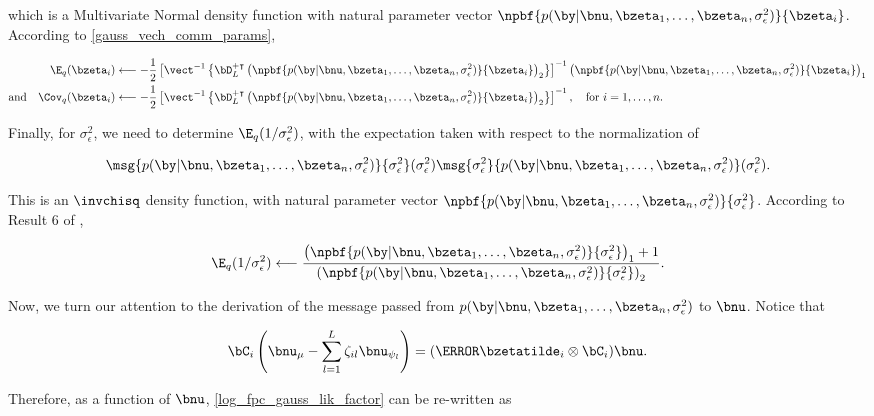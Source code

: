 \documentclass[12pt]{article}
\def\sigsqeps{\sigma^2_{\epsilon}}
\def\numu{\bnu_\mu}
\newcommand\nupsi[1]{\bnu_{\psi_{#1}}}
\theoremstyle{plain}
\theoremstyle{definition}
\theoremstyle{remark}
\begin{document}
\noindent which is a Multivariate Normal density function with natural parameter vector $\npbf{p (\by | \bnu, \bzeta_1,
\dots, \bzeta_n, \sigsqeps)}{\bzeta_i}$. According to \eqref{gauss_vech_comm_params},

\begin{align}
\begin{split}
	\E_q (\bzeta_i)
		&\longleftarrow
			-\frac12 \left[
				\vect^{-1} \left\{
					\bD_L^{+ \intercal}
					\left( \npbf{p (\by | \bnu, \bzeta_1, \dots, \bzeta_n, \sigsqeps)}{\bzeta_i} \right)_2
				\right\}
			\right]^{-1} \left( \npbf{p (\by | \bnu, \bzeta_1, \dots, \bzeta_n, \sigsqeps)}{\bzeta_i} \right)_1 \\
	\text{and} \quad
	\Cov_q (\bzeta_i)
		&\longleftarrow
			-\frac12 \left[
				\vect^{-1} \left\{
					\bD_L^{+ \intercal}
					\left( \npbf{p (\by | \bnu, \bzeta_1, \dots, \bzeta_n, \sigsqeps)}{\bzeta_i} \right)_2
				\right\}
			\right]^{-1}, \quad \text{for $i = 1, \dots, n$.}
\end{split}
\label{exp_lik_zeta}
\end{align}

\noindent Finally, for $\sigsqeps$, we need to determine $\E_q (1/\sigsqeps)$, with the expectation taken with
respect to the normalization of

\[
	\msg{p (\by | \bnu, \bzeta_1, \dots, \bzeta_n, \sigsqeps)}{\sigsqeps} (\sigsqeps)
	\msg{\sigsqeps}{p (\by | \bnu, \bzeta_1, \dots, \bzeta_n, \sigsqeps)} (\sigsqeps).
\]

\noindent This is an $\invchisq$ density function, with natural parameter vector $\npbf{p (\by | \bnu, \bzeta_1, \dots,
\bzeta_n, \sigsqeps)}{\sigsqeps}$. According to Result 6 of ,

\[
	\E_q (1/\sigsqeps)
		\longleftarrow
			\frac{
				\left( \npbf{p (\by | \bnu, \bzeta_1, \dots, \bzeta_n, \sigsqeps)}{\sigsqeps} \right)_1 + 1
			}{
				\left( \npbf{p (\by | \bnu, \bzeta_1, \dots, \bzeta_n, \sigsqeps)}{\sigsqeps} \right)_2
			}.
\]

Now, we turn our attention to the derivation of the message passed from $p (\by | \bnu, \bzeta_1, \dots, \bzeta_n,
\sigsqeps)$ to $\bnu$. Notice that

\begin{equation}
	\bC_i \left( \numu - \sum_{l=1}^L \zeta_{il} \nupsi{l} \right) = (\T{\bzetatilde_i} \otimes \bC_i) \bnu.
\label{theta_simplification}
\end{equation}

\noindent Therefore, as a function of $\bnu$, \eqref{log_fpc_gauss_lik_factor} can be re-written as
\end{document}
